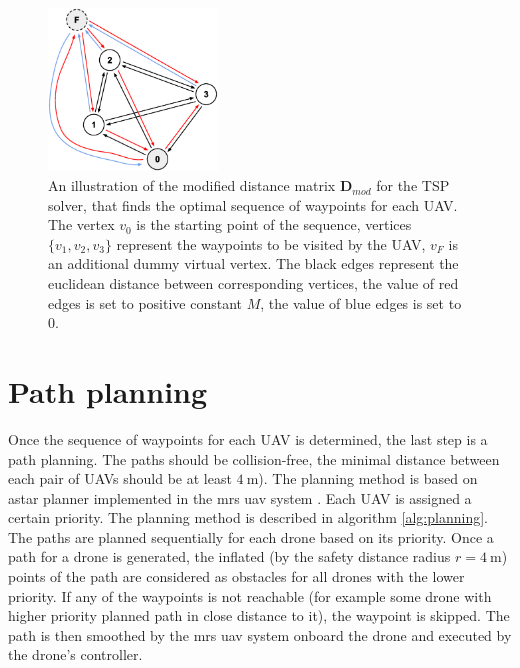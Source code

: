 \begin{figure}[!h]
    \centering
    \includegraphics[width=0.4\textwidth]{./fig/photos/TSP.eps}
    \caption{An illustration of the modified distance matrix $\mathbf{D}_{mod}$ for the \ac{TSP} solver, that finds the optimal sequence of waypoints for each \ac{UAV}. 
    The vertex $v_{0}$ is the starting point of the sequence, vertices $\{v_{1}, v_{2}, v_{3}\}$ represent the waypoints to be visited by the \ac{UAV}, $v_{F}$ is an additional dummy virtual vertex. 
    The black edges represent the euclidean distance between corresponding vertices, the value of red edges is set to positive constant $M$, the value of blue edges is set to $0$. }
    \label{fig:tsp}
\end{figure}

\section{Path planning}%
Once the sequence of waypoints for each \ac{UAV} is determined, the last step is a path planning.
The paths should be collision-free, the minimal distance between each pair of \ac{UAV}s should be at least $\SI{4}\meter$).
The planning method is based on astar planner implemented in the mrs uav system \cite{mrs_system}.
Each \ac{UAV} is assigned a certain priority.
The planning method is described in algorithm \ref{alg:planning}.
The paths are planned sequentially for each drone based on its priority.
Once a path for a drone is generated, the inflated (by the safety distance radius $r = \SI{4}\meter$) points of the path are considered as obstacles for all drones with the lower priority.
If any of the waypoints is not reachable (for example some drone with higher priority planned path in close distance to it), the waypoint is skipped.
The path is then smoothed by the mrs uav system \cite{mrs_system} onboard the drone and executed by the drone's controller.







